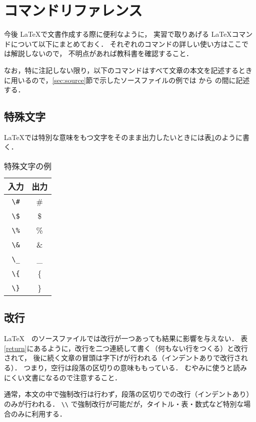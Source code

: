 \newpage
\section{コマンドリファレンス}
\label{sec:command_reference}

今後 \LaTeX で文書作成する際に便利なように，
実習で取りあげる \LaTeX コマンドについて以下にまとめておく．
それぞれのコマンドの詳しい使い方はここでは解説しないので，
不明点があれば教科書\cite{TeXText}を確認すること．

なお，特に注記しない限り，以下のコマンドはすべて文章の本文を記述するときに用いるので，\ref{sec:source}節で示したソースファイルの例では \verb|| から \verb|| の間に記述する．

\subsection{特殊文字}

\LaTeX では特別な意味をもつ文字をそのまま出力したいときには表\ref{special}のように書く．

\begin{table}[h]
    \caption{特殊文字の例}
    \label{special}
    \centering
    \begin{tabular}{c|c}
        入力 & 出力 \\ \hline
        \verb|\#| & \# \\
        \verb|\$| & \$ \\
        \verb|\%| & \%\\
        \verb|\&| & \& \\
        \verb|\_| & \_\\
        \verb|\{| & \{ \\
        \verb|\}| & \} \\
    \end{tabular}
\end{table}

\subsection{改行}
\label{sec:return}

\LaTeX　のソースファイルでは改行が一つあっても結果に影響を与えない．
表\ref{return}にあるように，改行を二つ連続して書く（何もない行をつくる）と改行されて，
後に続く文章の冒頭は字下げが行われる（インデントありで改行される）．
つまり，空行は段落の区切りの意味ももっている．
むやみに使うと読みにくい文書になるので注意すること．

通常，本文の中で強制改行は行わず，段落の区切りでの改行（インデントあり）のみが行われる．
\verb|\\| で強制改行が可能だが，タイトル・表・数式など特別な場合のみに利用する．

